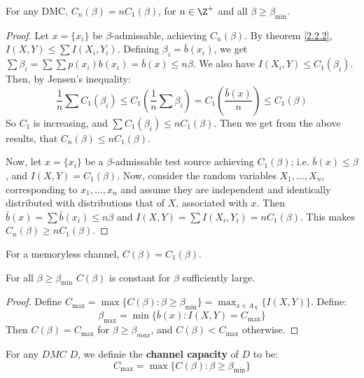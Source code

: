 \begin{theorem}\label{3.1.3}
    For any DMC, $C_n(\beta)=nC_1(\beta)$, for $n \in \Z^+$ and all  $\beta \geq
    \beta_{\min}$.
\end{theorem}
\begin{proof}
    Let $x=\{x_i\}$ be $\beta$-admissable, achieving  $C_n(\beta)$. By theorem
    \ref{2.2.2}, $I(X,Y) \leq \sum{I(X_i,Y_i)}$. Defining $\beta_i=\bar{b}(x_i)$,
    we get $\sum{\beta_i}=\sum{\sum{p(x_i)b(x_i)}}=\bar{b}(x) \leq n\beta$. We
    also have $I(X_i,Y) \leq C_1(\beta_i)$. Then, by Jensen's inequality:
    \begin{equation*}
        \frac{1}{n}\sum{C_1(\beta_i)} \leq
        C_1(\frac{1}{n}\sum{\beta_i})=C_1(\frac{\bar{b}(x)}{n}) \leq C_1(\beta)
    \end{equation*}
    So $C_1$ is increasing, and $\sum{C_1(\beta_i)} \leq nC_1(\beta)$. Then we
    get from the above results, that $C_n(\beta) \leq nC_1(\beta)$.

    Now, let $x=\{x_i\}$ be a $\beta$-admissable test source achieving
    $C_1(\beta)$; i.e. $\bar{b}(x) \leq \beta$, and $I(X,Y)=C_1(\beta)$. Now,
    consider the random variables $X_1, \dots, X_n$, corresponding to $x_1,
    \dots, x_n$ and assume they are independent and identically distributed with
    distributions that of $X$, associated with  $x$. Then
    $\bar{b}(x)=\sum{\bar{b}(x_i)} \leq n\beta$ and
    $I(X,Y)=\sum{I(X_i,Y_i)}=nC_1(\beta)$. This makes $C_n(\beta) \geq
    nC_1(\beta)$.
\end{proof}
\begin{corollary}
    For a memoryless channel, $C(\beta)=C_1(\beta)$.
\end{corollary}

\begin{lemma}\label{3.1.4}
    For all $\beta \geq \beta_{\min}$ $C(\beta)$ is constant for $\beta$
    sufficiently large.
\end{lemma}
\begin{proof}
    Define $C_{\max}=\max{\{C(\beta) : \beta \geq \beta_{\min}\}}=
    \max_{x \in A_X}{\{I(X,Y)\}}$. Define:
    \begin{equation*}
        \beta_{\max}= \min{\{\bar{b}(x) : I(X,Y)=C_{\max}\}}
    \end{equation*}
    Then $C(\beta)=C_{\max}$ for $\beta \geq \beta_{max}$,
    and $C(\beta) < C_{\max}$ otherwise.
\end{proof}

\begin{definition}
    For any $DMC$ $D$, we definie the \textbf{channel capacity} of $D$ to be:
    \begin{equation}
        C_{\max}=\max{\{C(\beta) : \beta \geq \beta_{\min}\}}
    \end{equation}
\end{definition}


